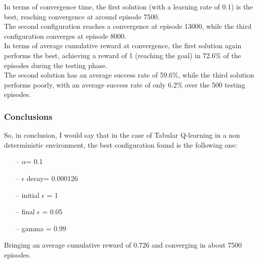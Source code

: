 \documentclass{article}
\begin{document}
\clearpage


In terms of convergence time, the first solution (with a learning rate of 0.1) is the best, reaching convergence at around episode 7500.
\\
The second configuration reaches a convergence at episode 13000, while the third configuration converges at episode 8000.
\\
In terms of average cumulative reward at convergence, the first solution again performs the best, achieving a reward of 1 (reaching the goal) in 72.6\% of the episodes during the testing phase.
\\
The second solution has an average success rate of 59.6\%, while the third solution performs poorly, with an average success rate of only 6.2\% over the 500 testing episodes.

\subsubsection{Conclusions}

So, in conclusion, I would say that in the case of Tabular Q-learning in a non deterministic environment, the best configuration found is the following one:
\begin{itemize}
\item[--] $\alpha$= 0.1
\item[--] $\epsilon$ decay= 0.000126
\item[--] initial $\epsilon$ = 1
\item[--] final $\epsilon$ = 0.05
\item[--] gamma = 0.99
\end{itemize}


Bringing an average cumulative reward of 0.726 and converging in about 7500 episodes.
\end{document}
